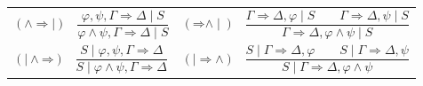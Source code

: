 \documentclass[10pt,a4paper]{article}
\theoremstyle{definition}
\newcommand{\3}{\vspace{.3in}}
\newcommand{\2}{\vspace{.2in}}
\newcommand{\1}{\vspace{.1in}}
\newcommand{\5}{\vspace{.05in}}
\begin{document}
\noindent\begin{tabular}{ll}	
	$(\mathord{\wedge}\mathord{\Rightarrow\mid})$ \ $\dfrac{\varphi, \psi,
		\Gamma \Rightarrow \Delta \mid S}{\varphi\wedge\psi, \Gamma
		\Rightarrow \Delta \mid S}$ &
	 $(\mathord{\Rightarrow}\mathord{\wedge\mid})$ \ $\dfrac{\Gamma
		\Rightarrow \Delta, \varphi \mid S \qquad
		\Gamma\Rightarrow \Delta,
		\psi \mid S}{\Gamma \Rightarrow \Delta,
		\varphi\wedge\psi \mid S}$\\[16pt]
	
 $(\mathord{\mid\wedge}\mathord{\Rightarrow})$ \ $\dfrac{S \mid \varphi, \psi,
		\Gamma \Rightarrow \Delta}{S \mid \varphi\wedge\psi, \Gamma
		\Rightarrow \Delta}$ &
 $(\mathord{\mid\Rightarrow}\mathord{\wedge})$ \ $\dfrac{S\mid \Gamma
		\Rightarrow \Delta, \varphi \qquad
		S\mid \Gamma\Rightarrow \Delta,
		\psi}{S\mid\Gamma \Rightarrow \Delta,
		\varphi\wedge\psi }$\\[16pt]
\end{tabular}
\end{document}
